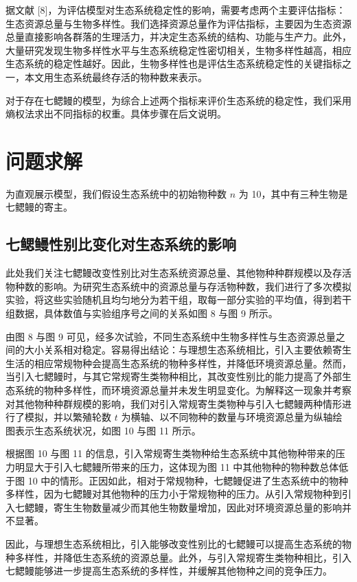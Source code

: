 \documentclass[11pt,a4paper]{ctexart}
\begin{document}
据文献 [8]，为评估模型对生态系统稳定性的影响，需要考虑两个主要评估指标：生态资源总量与生物多样性。我们选择资源总量作为评估指标，主要因为生态资源总量直接影响各群落的生理活力，并决定生态系统的结构、功能与生产力。此外，大量研究发现生物多样性水平与生态系统稳定性密切相关，生物多样性越高，相应生态系统的稳定性越好。因此，生物多样性也是评估生态系统稳定性的关键指标之一，本文用生态系统最终存活的物种数来表示。

对于存在七鳃鳗的模型，为综合上述两个指标来评价生态系统的稳定性，我们采用熵权法求出不同指标的权重。具体步骤在后文说明。
\section{问题求解}

为直观展示模型，我们假设生态系统中的初始物种数 $n$ 为 10，其中有三种生物是七鳃鳗的寄主。

\subsection{七鳃鳗性别比变化对生态系统的影响}

此处我们关注七鳃鳗改变性别比对生态系统资源总量、其他物种种群规模以及存活物种数的影响。为研究生态系统中的资源总量与存活物种数，我们进行了多次模拟实验，将这些实验随机且均匀地分为若干组，取每一部分实验的平均值，得到若干组数据，具体数值与实验组序号之间的关系如图 8 与图 9 所示。

由图 8 与图 9 可见，经多次试验，不同生态系统中生物多样性与生态资源总量之间的大小关系相对稳定。容易得出结论：与理想生态系统相比，引入主要依赖寄生生活的相应常规物种会提高生态系统的物种多样性，并降低环境资源总量。然而，当引入七鳃鳗时，与其它常规寄生类物种相比，其改变性别比的能力提高了外部生态系统的物种多样性，而环境资源总量并未发生明显变化。为解释这一现象并考察对其他物种种群规模的影响，我们对引入常规寄生类物种与引入七鳃鳗两种情形进行了模拟，并以繁殖轮数 $t$ 为横轴、以不同物种的数量与环境资源总量为纵轴绘图表示生态系统状况，如图 10 与图 11 所示。

根据图 10 与图 11 的信息，引入常规寄生类物种给生态系统中其他物种带来的压力明显大于引入七鳃鳗所带来的压力，这体现为图 11 中其他物种的物种数总体低于图 10 中的情形。正因如此，相对于常规物种，七鳃鳗促进了生态系统中的物种多样性，因为七鳃鳗对其他物种的压力小于常规物种的压力。从引入常规物种到引入七鳃鳗，寄生生物数量减少而其他生物数量增加，因此对环境资源总量的影响并不显著。

因此，与理想生态系统相比，引入能够改变性别比的七鳃鳗可以提高生态系统的物种多样性，并降低生态系统的资源总量。此外，与引入常规寄生类物种相比，引入七鳃鳗能够进一步提高生态系统的多样性，并缓解其他物种之间的竞争压力。
\end{document}
